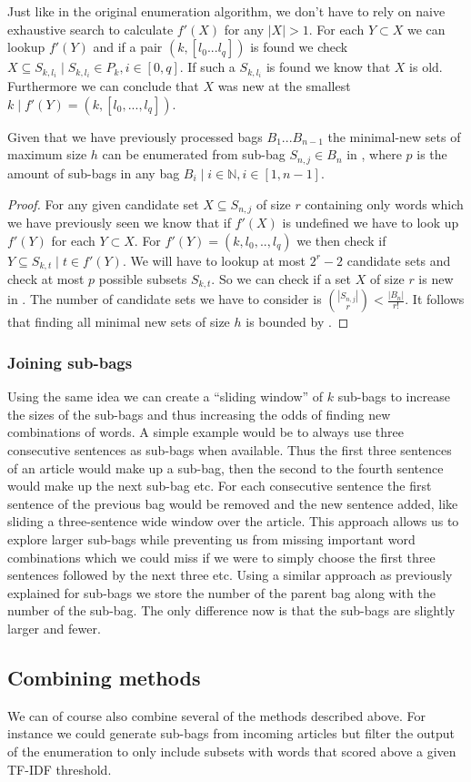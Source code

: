 Just like in the original enumeration algorithm, we don't have to rely on naive exhaustive search to calculate $f'(X)$ for any $|X|>1$. For each $Y\subset X$ we can lookup $f'(Y)$ and if a pair $(k, [l_{0}... l_{q}])$ is found we check $X \subseteq S_{k, l_{i}} \mid S_{k, l_{i}} \in P_{k}, i\in[0,q]$. If such a $S_{k,l_{i}}$ is found we know that $X$ is old. Furthermore we can conclude that $X$ was new at the smallest $k \mid f'(Y)=(k, [l_{0},..., l_{q}])$.

\begin{theorem}
  Given that we have previously processed bags $B_{1}...B_{n-1}$ the minimal-new sets of maximum size $h$ can be enumerated from sub-bag $S_{n, j}\in B_{n}$ in , where $p$ is the amount of sub-bags in any bag $B_{i} \mid i \in \mathbb{N}, i \in [1,n-1]$.
\end{theorem}
\begin{proof}
  For any given candidate set $X \subseteq S_{n, j}$ of size $r$ containing only words which we have previously seen we know that if $f'(X)$ is undefined we have to look up $f'(Y)$ for each $Y \subset X$. For $f'(Y) = (k, l_{0},..,l_{q})$ we then check if $Y \subseteq S_{k, t} \mid t \in f'(Y)$. We will have to lookup at most $2^{r}-2$ candidate sets and check at most $p$ possible subsets $S_{k, t}$. So we can check if a set $X$ of size $r$ is new in . The number of candidate sets we have to consider is $\binom{|S_{n, j}|}{r} < \frac{|B_{n}|}{r!}$. It follows that finding all minimal new sets of size $h$ is bounded by .
\end{proof}

\subsubsection{Joining sub-bags}
Using the same idea we can create a ``sliding window'' of $k$ sub-bags to increase the sizes of the sub-bags and thus increasing the odds of finding new combinations of words. A simple example would be to always use three consecutive sentences as sub-bags when available. Thus the first three sentences of an article would make up a sub-bag, then the second to the fourth sentence would make up the next sub-bag etc. For each consecutive sentence the first sentence of the previous bag would be removed and the new sentence added, like sliding a three-sentence wide window over the article. This approach allows us to explore larger sub-bags while preventing us from missing important word combinations which we could miss if we were to simply choose the first three sentences followed by the next three etc. Using a similar approach as previously explained for sub-bags we store the number of the parent bag along with the number of the sub-bag. The only difference now is that the sub-bags are slightly larger and fewer.

\subsection{Combining methods}
We can of course also combine several of the methods described above. For instance we could generate sub-bags from incoming articles but filter the output of the enumeration to only include subsets with words that scored above a given TF-IDF threshold.

